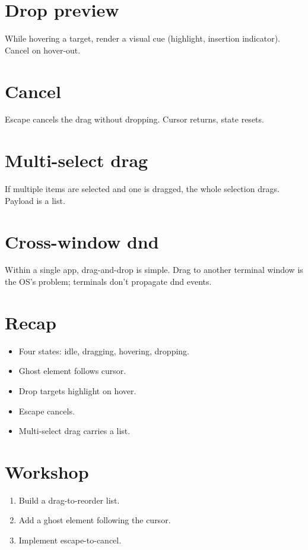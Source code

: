 \section{Drop preview}

While hovering a target, render a visual cue (highlight,
insertion indicator). Cancel on hover-out.

\section{Cancel}

Escape cancels the drag without dropping. Cursor returns,
state resets.

\section{Multi-select drag}

If multiple items are selected and one is dragged, the
whole selection drags. Payload is a list.

\section{Cross-window dnd}

Within a single \maya{} app, drag-and-drop is simple. Drag
to another terminal window is the OS's problem;
terminals don't propagate dnd events.

\section{Recap}

\begin{recap}
\begin{itemize}[leftmargin=*]
  \item Four states: idle, dragging, hovering, dropping.
  \item Ghost element follows cursor.
  \item Drop targets highlight on hover.
  \item Escape cancels.
  \item Multi-select drag carries a list.
\end{itemize}
\end{recap}

\section*{Workshop}

\begin{enumerate}[leftmargin=*]
  \item Build a drag-to-reorder list.
  \item Add a ghost element following the cursor.
  \item Implement escape-to-cancel.
\end{enumerate}
